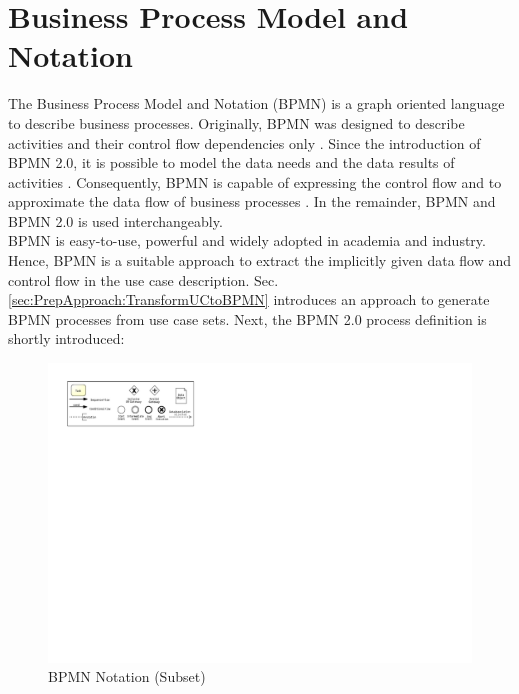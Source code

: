\section{Business Process Model and Notation}
\label{sec:PrepApproach:BPMN}
The Business Process Model and Notation (BPMN) is a graph oriented language to describe business processes. Originally, BPMN was designed to describe activities and their control flow dependencies only \cite{VisualizeBPMN}. Since the introduction of BPMN 2.0, it is possible to model the data needs and the data results of activities \cite{OMG}. Consequently, BPMN is capable of expressing the control flow and to approximate the data flow of business processes \cite{DataFlowErrorBPMN}. In the remainder, BPMN and BPMN 2.0 is used interchangeably. \\
BPMN is easy-to-use, powerful and widely adopted in academia and industry. Hence, BPMN is a suitable approach to extract the implicitly given data flow and control flow in the use case description. Sec.\ref{sec:PrepApproach:TransformUCtoBPMN} introduces an approach to generate BPMN processes from use case sets. Next, the BPMN 2.0 process definition is shortly introduced:

\begin{figure}[h!]
	\includegraphics[width=\textwidth, trim={1cm 16.8cm 19.5cm 1cm}]{img/Overview.pdf}
	\caption{BPMN Notation (Subset)}
	\label{fig:BPMNSubset}
\end{figure}

